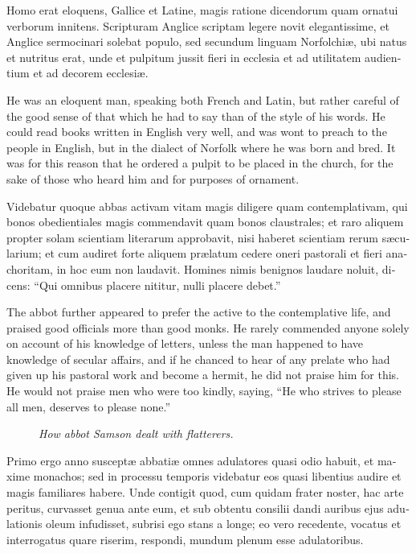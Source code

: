 \documentclass[10pt]{book}
\newcommand{\blockhead}[4][]{
\begin{figure}
\centering
\vspace{#4}
\parbox{2.75cm}{\begin{center}\footnotesize \color{BrickRed} \emph{#2}\\ #1 \end{center}}
\end{figure}
}
\begin{document}
\begin{paracol}{2}
\switchcolumn*

\begin{otherlanguage}{latin}
Homo erat eloquens, Gallice et Latine, magis ratione dicendorum quam ornatui verborum innitens. Scripturam Anglice scriptam legere novit elegantissime, et Anglice sermocinari solebat populo, sed secundum linguam Norfolchi\ae{}, ubi natus et nutritus erat, unde et pulpitum jussit fieri in ecclesia et ad utilitatem audientium et ad decorem ecclesi\ae{}.
\end{otherlanguage}

\switchcolumn

He was an eloquent man, speaking both French and Latin, but rather careful of the good sense of that which he had to say than of the style of his words. He could read books written in English very well, and was wont to preach to the people in English, but in the dialect of Norfolk where he was born and bred. It was for this reason that he ordered a pulpit to be placed in the church, for the sake of those who heard him and for purposes of ornament.

\switchcolumn*

\begin{otherlanguage}{latin}
Videbatur quoque abbas activam vitam magis diligere quam contemplativam, qui bonos obedientiales magis commendavit quam bonos claustrales; et raro aliquem propter solam scientiam literarum approbavit, nisi haberet scientiam rerum s\ae{}cularium; et cum audiret forte aliquem pr\ae{}latum cedere oneri pastorali et fieri anachoritam, in hoc eum non laudavit. Homines nimis benignos laudare noluit, dicens: ``Qui omnibus placere nititur, nulli placere debet.''
\end{otherlanguage}

\switchcolumn

The abbot further appeared to prefer the active to the contemplative life, and praised good officials more than good monks. He rarely commended anyone solely on account of his knowledge of letters, unless the man happened to have knowledge of secular affairs, and if he chanced to hear of any prelate who had given up his pastoral work and become a hermit, he did not praise him for this. He would not praise men who were too kindly, saying, ``He who strives to please all men, deserves to please none.''

\switchcolumn*

\begin{otherlanguage}{latin}
\blockhead{How abbot Samson dealt with flatterers.}{3}{-0.55cm}
Primo ergo anno suscept\ae{} abbati\ae{} omnes adulatores quasi odio habuit, et maxime monachos; sed in processu temporis videbatur eos quasi libentius audire et magis familiares habere. Unde contigit quod, cum quidam frater noster, hac arte peritus, curvasset genua ante eum, et sub obtentu consilii dandi auribus ejus adulationis oleum infudisset, subrisi ego stans a longe; eo vero recedente, vocatus et interrogatus quare riserim, respondi, mundum plenum esse adulatoribus.


\end{otherlanguage}
\end{paracol}
\end{document}
